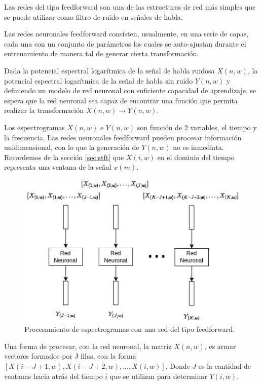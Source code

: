 Las redes del tipo feedforward \cite{deep_learning} son una de las estructuras de red más simples que se puede utilizar como filtro de ruido en señales de habla. 

Las redes neuronales feedforward consisten, usualmente, en una serie de capas, cada una con un conjunto de parámetros los cuales se auto-ajustan durante el entrenamiento de manera tal de generar cierta transformación.

Dada la potencial espectral logarítmica de la señal de habla ruidosa $X(n, w)$, la potencial espectral logarítmica de la señal de habla sin ruido $Y(n, w)$ y definiendo un modelo de red neuronal con suficiente capacidad de aprendizaje, se espera que la red neuronal sea capaz de encontrar una función que permita realizar la transformación $X(n, w) \longrightarrow Y(n, w)$.

Los espectrogramas $X(n, w)$ e $Y(n, w)$ son función de 2 variables, el tiempo y la frecuencia. Las redes neuronales feedforward pueden procesar información unidimensional, con lo que la generación de $Y(n, w)$ no es inmediata. Recordemos de la sección \ref{sec:stft} que $X(i,w)$ en el dominio del tiempo representa una ventana de la señal $x(m)$. 

\begin{figure}
	\centering
	\centerline{\includegraphics[scale=0.7]{images/ch3/features-ffnn.png}}
	\caption{Procesamiento de espectrogramas con una red del tipo feedforward.}
	\label{fig:ch3_features_ffnn}
\end{figure}

Una forma de procesar, con la red neuronal, la matriz $X(n, w)$, es armar vectores formados por J filas, con la forma $[X(i-J+1,w), X(i-J+2,w), ... , X(i,w)]$. Donde $J$ es la cantidad de ventanas hacia atrás del tiempo $i$ que se utilizan para determinar $Y(i, w)$. 

